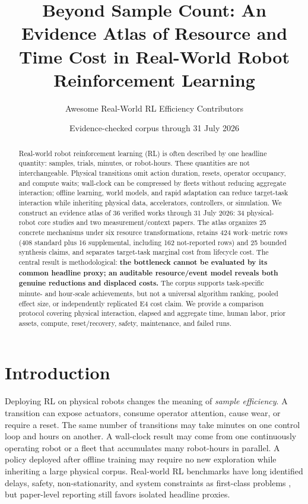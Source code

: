 \documentclass[11pt]{article}
\title{Beyond Sample Count: An Evidence Atlas of Resource and Time Cost in Real-World Robot Reinforcement Learning}
\author{Awesome Real-World RL Efficiency Contributors}
\date{Evidence-checked corpus through 31 July 2026}
\begin{document}
\maketitle

\begin{abstract}
Real-world robot reinforcement learning (RL) is often described by one headline quantity: samples, trials, minutes, or robot-hours. These quantities are not interchangeable. Physical transitions omit action duration, resets, operator occupancy, and compute waits; wall-clock can be compressed by fleets without reducing aggregate interaction; offline learning, world models, and rapid adaptation can reduce target-task interaction while inheriting physical data, accelerators, controllers, or simulation. We construct an evidence atlas of 36 verified works through 31 July 2026: 34 physical-robot core studies and two measurement/context papers. The atlas organizes 25 concrete mechanisms under six resource transformations, retains 424 work--metric rows (408 standard plus 16 supplemental, including 162 not-reported rows) and 25 bounded synthesis claims, and separates target-task marginal cost from lifecycle cost. The central result is methodological: \textbf{the bottleneck cannot be evaluated by its common headline proxy; an auditable resource/event model reveals both genuine reductions and displaced costs.} The corpus supports task-specific minute- and hour-scale achievements, but not a universal algorithm ranking, pooled effect size, or independently replicated E4 cost claim. We provide a comparison protocol covering physical interaction, elapsed and aggregate time, human labor, prior assets, compute, reset/recovery, safety, maintenance, and failed runs.
\end{abstract}

\section{Introduction}

Deploying RL on physical robots changes the meaning of \emph{sample efficiency}. A transition can expose actuators, consume operator attention, cause wear, or require a reset. The same number of transitions may take minutes on one control loop and hours on another. A wall-clock result may come from one continuously operating robot or a fleet that accumulates many robot-hours in parallel. A policy deployed after offline training may require no new exploration while inheriting a large physical corpus. Real-world RL benchmarks have long identified delays, safety, non-stationarity, and system constraints as first-class problems \cite{dulacarnold2019challenges,dulacarnold2021challenges}, but paper-level reporting still favors isolated headline proxies.
\end{document}
